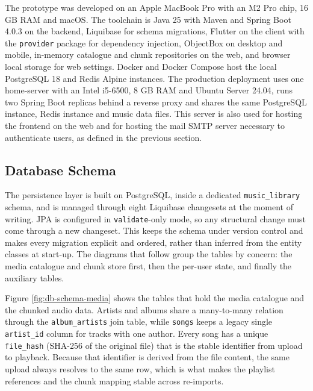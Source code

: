 \indent \par The prototype was developed on an Apple MacBook Pro with an M2 Pro chip, 16 GB RAM and macOS. The toolchain is Java 25 with Maven and Spring Boot 4.0.3 on the backend, Liquibase for schema migrations, Flutter on the client with the \texttt{provider} package for dependency injection, ObjectBox on desktop and mobile, in-memory catalogue and chunk repositories on the web, and browser local storage for web settings. Docker and Docker Compose host the local PostgreSQL 18 and Redis Alpine instances. The production deployment uses one home-server with an Intel i5-6500, 8 GB RAM and Ubuntu Server 24.04, runs two Spring Boot replicas behind a reverse proxy and shares the same PostgreSQL instance, Redis instance and music data files. This server is also used for hosting the frontend on the web and for hosting the mail SMTP server necessary to authenticate users, as defined in the previous section.


\subsection{Database Schema}
\label{sec:db-schema}

\indent \par The persistence layer is built on PostgreSQL, inside a dedicated \texttt{music\_library} schema, and is managed through eight Liquibase changesets at the moment of writing. JPA is configured in \texttt{validate}-only mode, so any structural change must come through a new changeset. This keeps the schema under version control and makes every migration explicit and ordered, rather than inferred from the entity classes at start-up. The diagrams that follow group the tables by concern: the media catalogue and chunk store first, then the per-user state, and finally the auxiliary tables.

\indent \par Figure \ref{fig:db-schema-media} shows the tables that hold the media catalogue and the chunked audio data. Artists and albums share a many-to-many relation through the \texttt{album\_artists} join table, while \texttt{songs} keeps a legacy single \texttt{artist\_id} column for tracks with one author. Every song has a unique \texttt{file\_hash} (SHA-256 of the original file) that is the stable identifier from upload to playback. Because that identifier is derived from the file content, the same upload always resolves to the same row, which is what makes the playlist references and the chunk mapping stable across re-imports.

